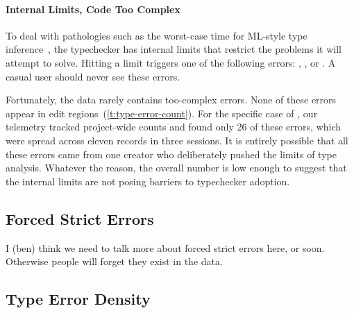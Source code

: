 \documentclass[english,submission,cleveref]{programming}
\begin{document}
\paragraph{Internal Limits, Code Too Complex}

To deal with pathologies such as the worst-case time for ML-style type
inference~\cite{m-popl-1990,ktu-caap-1990}, the typechecker
has internal limits that restrict the problems it will attempt to solve.
Hitting a limit triggers one of the following errors:
,
, or
.
A casual user should never see these errors.

Fortunately, the data rarely contains too-complex errors.
None of these errors appear in edit regions~(\cref{t:type-error-count}).
For the specific case of , our telemetry tracked project-wide
counts and found only 26 of these errors, which were spread across eleven
records in three sessions.
It is entirely possible that all these errors came from one creator who
deliberately pushed the limits of type analysis.
Whatever the reason, the overall number is low enough to suggest that the
internal limits are not posing barriers to typechecker adoption.


\subsection{Forced Strict Errors}

\FILL{} I (ben) think we need to talk more about forced strict errors here, or soon.
Otherwise people will forget they exist in the data.


\subsection{Type Error Density}
\end{document}
